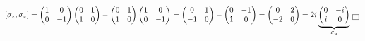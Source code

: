 \documentclass[solutions.tex]{subfiles}
\begin{document}
\[
	[\sigma_z, \sigma_x] = \begin{pmatrix}
		1 & 0 \\
		0 & -1 \\
	\end{pmatrix}\begin{pmatrix}
		0 & 1 \\
		1 & 0 \\
	\end{pmatrix} - \begin{pmatrix}
		0 & 1 \\
		1 & 0 \\
	\end{pmatrix}\begin{pmatrix}
		1 & 0 \\
		0 & -1 \\
	\end{pmatrix} = \begin{pmatrix}
		0 & 1 \\
		-1 & 0 \\
	\end{pmatrix} - \begin{pmatrix}
		0 & -1 \\
		1 & 0 \\
	\end{pmatrix} = \begin{pmatrix}
		0 & 2 \\
		-2 & 0 \\
	\end{pmatrix} = 2i\underbrace{\begin{pmatrix}
		0 & -i \\
		i & 0 \\
	\end{pmatrix}}_{\sigma_y} \qed
\]
\end{document}

